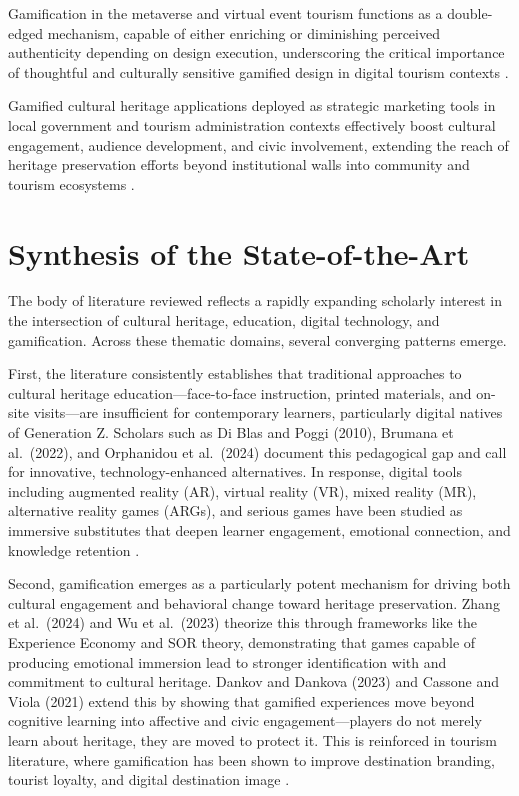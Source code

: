 \documentclass{research}
\begin{document}
Gamification in the metaverse and virtual event tourism functions as a double-edged
mechanism, capable of either enriching or diminishing perceived authenticity depending
on design execution, underscoring the critical importance of thoughtful and culturally
sensitive gamified design in digital tourism contexts
\citep{flavian2024,zhang2025,malik2024}.

Gamified cultural heritage applications deployed as strategic marketing tools in local
government and tourism administration contexts effectively boost cultural engagement,
audience development, and civic involvement, extending the reach of heritage
preservation efforts beyond institutional walls into community and tourism ecosystems
\citep{cassone2021,samanta2022,aboushouk2021,zhang2025}.

\section{Synthesis of the State-of-the-Art}

The body of literature reviewed reflects a rapidly expanding scholarly interest in the
intersection of cultural heritage, education, digital technology, and gamification.
Across these thematic domains, several converging patterns emerge.

First, the literature consistently establishes that traditional approaches to cultural
heritage education---face-to-face instruction, printed materials, and on-site
visits---are insufficient for contemporary learners, particularly digital natives of
Generation Z. Scholars such as Di Blas and Poggi (2010), Brumana et al.\ (2022), and
Orphanidou et al.\ (2024) document this pedagogical gap and call for innovative,
technology-enhanced alternatives. In response, digital tools including augmented reality
(AR), virtual reality (VR), mixed reality (MR), alternative reality games (ARGs), and
serious games have been studied as immersive substitutes that deepen learner engagement,
emotional connection, and knowledge retention
\citep{stylianidis2025,tian2025,huang2023,lin2024}.

Second, gamification emerges as a particularly potent mechanism for driving both
cultural engagement and behavioral change toward heritage preservation. Zhang et al.\
(2024) and Wu et al.\ (2023) theorize this through frameworks like the Experience
Economy and SOR theory, demonstrating that games capable of producing emotional
immersion lead to stronger identification with and commitment to cultural heritage.
Dankov and Dankova (2023) and Cassone and Viola (2021) extend this by showing that
gamified experiences move beyond cognitive learning into affective and civic
engagement---players do not merely learn about heritage, they are moved to protect it.
This is reinforced in tourism literature, where gamification has been shown to improve
destination branding, tourist loyalty, and digital destination image
\citep{aboushouk2021,zhang2025}.
\end{document}
